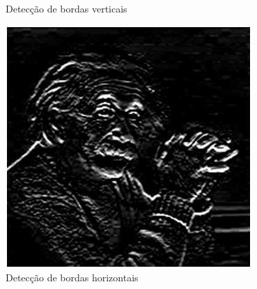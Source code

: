 \documentclass[a4paper, 12pt]{article}
\begin{document}
\begin{figure}[!htb]
		\caption{Detecção de bordas verticais}
  	\endminipage\hspace{1cm}
	  	\includegraphics[width=\linewidth]{images/sobelhori.jpg}
	  	\caption{Detecção de bordas horizontais}
	\endminipage
\end{figure}
\end{document}
